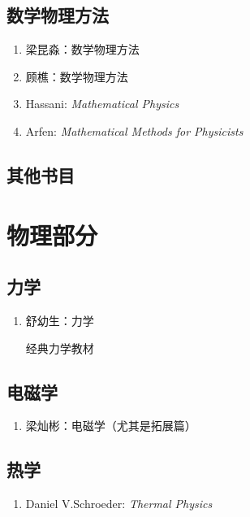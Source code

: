 \subsection*{数学物理方法}

\begin{enumerate}
  \item 梁昆淼：数学物理方法
  \item 顾樵：数学物理方法
  \item Hassani: \textit{Mathematical Physics}
  
  \item Arfen: \textit{Mathematical Methods for Physicists}
\end{enumerate}

\subsection*{其他书目}

\section{物理部分}

\subsection*{力学}

\begin{enumerate}
  \item 舒幼生：力学

  经典力学教材
\end{enumerate}

\subsection*{电磁学}

\begin{enumerate}
  \item 梁灿彬：电磁学（尤其是拓展篇）
\end{enumerate}

\subsection*{热学}

\begin{enumerate}
  \item Daniel V.Schroeder: \textit{Thermal Physics}
\end{enumerate}

